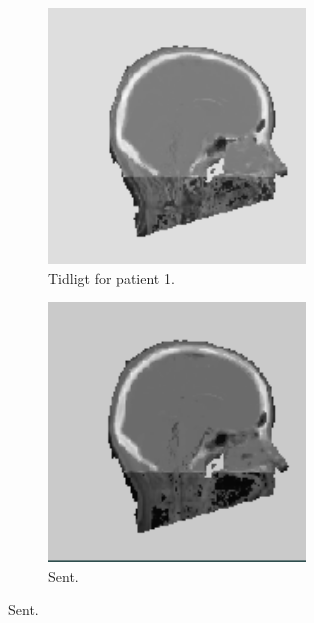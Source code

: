 \begin{figure}
    \centering
    \begin{subfigure}{0.3\textwidth}
        \centering
        \includegraphics[width=0.75\textwidth]{colager/over_tid_sct/over_tid_sct_121280_early.png}
        \caption{Tidligt for patient 1.}
        \label{col:over_time_sct_pat1_early}
    \end{subfigure}\hfill
    \begin{subfigure}{0.3\textwidth}
        \centering
        \includegraphics[width=0.75\textwidth]{colager/over_tid_sct/over_tid_sct_121280_late.png}
        \caption{Sent.}
        \label{col:over_time_sct_pat1_late}
    \end{subfigure}\hfill

\end{figure}
